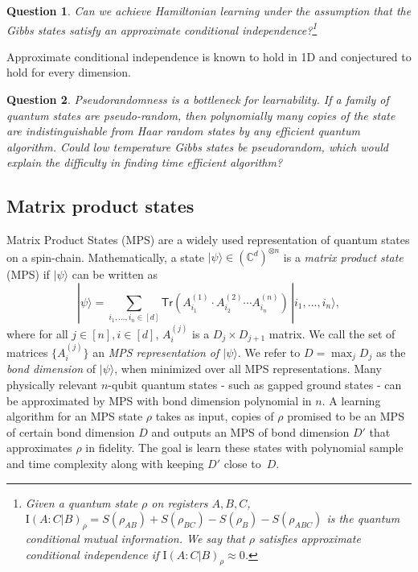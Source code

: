 \documentclass[11pt]{article}
\newcommand{\ket}[1]{|#1\rangle}
\newcommand{\Tr}{\textsf{Tr}}
\newtheorem{question}{Question}
\newcommand{\MPS}[3]{#1^{(#2)}_{#3}}
\begin{document}
\begin{question}
    Can we achieve Hamiltonian learning under the assumption that the Gibbs states satisfy an approximate conditional independence?\footnote{Given a quantum state $\rho$ on registers $A,B,C$, $\mathrm{I}(A:C|B)_{\rho} = S(\rho_{AB})+S(\rho_{BC})- S(\rho_B)-S(\rho_{ABC})$ is the quantum conditional mutual information. We say that $\rho$ satisfies approximate conditional independence if $\mathrm{I}(A:C|B)_{\rho}\approx 0$.} 
\end{question}

Approximate conditional independence is known to hold in 1D \cite{KatoB2019} and conjectured to hold for every dimension. 

\begin{question}
Pseudorandomness is a bottleneck for learnability. If a family of quantum states are pseudo-random, then polynomially many copies of the state are indistinguishable from Haar random states by any efficient quantum algorithm. Could low temperature Gibbs states be pseudorandom, which would explain the difficulty in finding time efficient algorithm?
\end{question}



\subsection{Matrix product states}
Matrix Product States (MPS) are a widely used representation of quantum states on a spin-chain. Mathematically, a state $\ket{\psi}\in (\mathbb{C}^{d})^{\otimes n}$ is a \emph{matrix product state} (MPS) if $\ket{\psi}$ can be written as
	$$
	\ket{\psi}=\sum_{i_1,\ldots,i_n \in [d]} \Tr(\MPS{A}{1}{i_1} \cdot \MPS{A}{2}{i_2}\cdots \MPS{A}{n}{i_n}) \, \ket{i_1,\ldots,i_n},
	$$
	where for all $j \in [n], i \in [d]$, $\MPS{A}{j}{i}$ is a  $D_j\times D_{j+1}$ matrix. We call the set of matrices $\{\MPS{A}{j}{i}\}$ an \emph{\textsf{MPS} representation of $\ket{\psi}$}. We refer to $D=\max_{j} D_j$ as the \emph{bond dimension} of $\ket{\psi}$, when minimized over all \textsf{MPS} representations. Many physically relevant $n$-qubit quantum states - such as gapped ground states - can be approximated by \textsf{MPS} with bond dimension polynomial in $n$. A learning algorithm for an \textsf{MPS} state $\rho$ takes as input, copies of $\rho$ promised to be an \textsf{MPS} of certain bond dimension $D$ and outputs an \textsf{MPS} of bond dimension $D'$ that approximates $\rho$ in fidelity. The goal is learn these states with polynomial sample and time complexity  along with keeping $D'$ close to~$D$.
\end{document}
